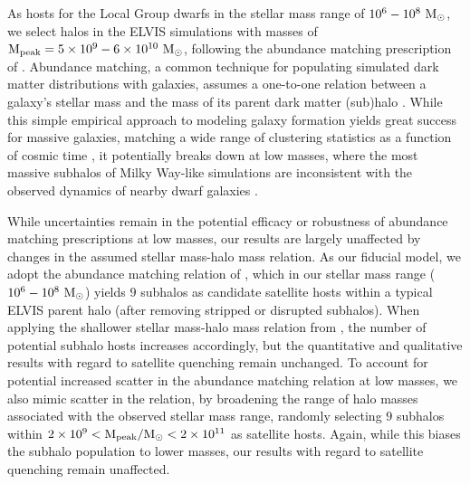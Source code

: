\documentclass[usenatbib]{mn2e}
\newcommand{\msun}{{\rm M}_{\odot}}
\begin{document}
As hosts for the Local Group dwarfs in the stellar mass range of
$10^{6}-10^{8}~\msun$, we select halos in the ELVIS simulations with
masses of ${\rm M}_{\rm peak} = 5\times10^{9}-6\times10^{10}~\msun$,
following the abundance matching prescription of
\citet{gk14}. Abundance matching, a common technique for populating
simulated dark matter distributions with galaxies, assumes a
one-to-one relation between a galaxy's stellar mass and the mass of
its parent dark matter (sub)halo \citep{behroozi13, moster13}. While
this simple empirical approach to modeling galaxy formation yields
great success for massive galaxies, matching a wide range of
clustering statistics as a function of cosmic time
\citep[e.g.][]{berrier06, conroy06}, it potentially breaks down at low
masses, where the most massive subhalos of Milky Way-like simulations
are inconsistent with the observed dynamics of nearby dwarf galaxies
\citep{bk11, bk12, gk14b, kirby14, tollerud14}.


While uncertainties remain in the potential efficacy or robustness of
abundance matching prescriptions at low masses, our results are
largely unaffected by changes in the assumed stellar mass-halo mass
relation. As our fiducial model, we adopt the abundance matching
relation of \citet{gk14}, which in our stellar mass range ($10^{6} -
10^{8}~\msun$) yields $9$ subhalos as candidate satellite hosts within
a typical ELVIS parent halo (after removing stripped or disrupted
subhalos). When applying the shallower stellar mass-halo mass relation
from \citet{behroozi13}, the number of potential subhalo hosts
increases accordingly, but the quantitative and qualitative results
with regard to satellite quenching remain unchanged. To account for
potential increased scatter in the abundance matching relation at low
masses, we also mimic scatter in the \citet{gk14} relation, by
broadening the range of halo masses associated with the observed
stellar mass range, randomly selecting $9$ subhalos within $2 \times
10^{9} < {\rm M}_{\rm peak}/\msun < 2 \times 10^{11}$ as satellite
hosts. Again, while this biases the subhalo population to lower
masses, our results with regard to satellite quenching remain
unaffected.
\end{document}
